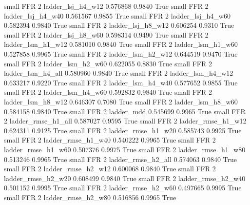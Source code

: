      small      FFR                 2        ladder_lsj_h4_w12   0.576868      0.9840    True
     small      FFR                 2        ladder_lsj_h4_w40   0.561567      0.9855    True
     small      FFR                 2        ladder_lsj_h4_w60   0.582394      0.9840    True
     small      FFR                 2        ladder_lsj_h8_w12   0.606254      0.9310    True
     small      FFR                 2        ladder_lsj_h8_w60   0.598314      0.9490    True
     small      FFR                 2        ladder_lsm_h1_w12   0.581010      0.9840    True
     small      FFR                 2        ladder_lsm_h1_w60   0.527858      0.9965    True
     small      FFR                 2        ladder_lsm_h2_w12   0.644519      0.9470    True
     small      FFR                 2        ladder_lsm_h2_w60   0.622055      0.8830    True
     small      FFR                 2        ladder_lsm_h4_all   0.580960      0.9840    True
     small      FFR                 2        ladder_lsm_h4_w12   0.633217      0.9220    True
     small      FFR                 2        ladder_lsm_h4_w40   0.577652      0.9855    True
     small      FFR                 2        ladder_lsm_h4_w60   0.592832      0.9840    True
     small      FFR                 2        ladder_lsm_h8_w12   0.646307      0.7080    True
     small      FFR                 2        ladder_lsm_h8_w60   0.584158      0.9840    True
     small      FFR                 2               ladder_mdd   0.545699      0.9965    True
     small      FFR                 2       ladder_rmse_h1_all   0.587027      0.9595    True
     small      FFR                 2       ladder_rmse_h1_w12   0.624311      0.9125    True
     small      FFR                 2       ladder_rmse_h1_w20   0.585743      0.9925    True
     small      FFR                 2       ladder_rmse_h1_w40   0.540222      0.9965    True
     small      FFR                 2       ladder_rmse_h1_w60   0.507376      0.9975    True
     small      FFR                 2       ladder_rmse_h1_w80   0.513246      0.9965    True
     small      FFR                 2       ladder_rmse_h2_all   0.574063      0.9840    True
     small      FFR                 2       ladder_rmse_h2_w12   0.600068      0.9840    True
     small      FFR                 2       ladder_rmse_h2_w20   0.608499      0.9840    True
     small      FFR                 2       ladder_rmse_h2_w40   0.501152      0.9995    True
     small      FFR                 2       ladder_rmse_h2_w60   0.497665      0.9995    True
     small      FFR                 2       ladder_rmse_h2_w80   0.516856      0.9965    True
